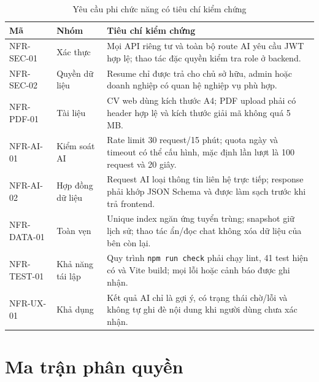 \begin{table}[H]
    \centering
    \small
    \begin{tabularx}{\textwidth}{|p{}|p{}|Y|} \hline
        \textbf{Mã} & \textbf{Nhóm} & \textbf{Tiêu chí kiểm chứng} \\ \hline
        NFR-SEC-01 & Xác thực & Mọi API riêng tư và toàn bộ route AI yêu cầu JWT hợp lệ; thao tác đặc quyền kiểm tra role ở backend. \\ \hline
        NFR-SEC-02 & Quyền dữ liệu & Resume chỉ được trả cho chủ sở hữu, admin hoặc doanh nghiệp có quan hệ nghiệp vụ phù hợp. \\ \hline
        NFR-PDF-01 & Tài liệu & CV web dùng kích thước A4; PDF upload phải có header hợp lệ và kích thước giải mã không quá 5 MB. \\ \hline
        NFR-AI-01 & Kiểm soát AI & Rate limit 30 request/15 phút; quota ngày và timeout có thể cấu hình, mặc định lần lượt là 100 request và 20 giây. \\ \hline
        NFR-AI-02 & Hợp đồng dữ liệu & Request AI loại thông tin liên hệ trực tiếp; response phải khớp JSON Schema và được làm sạch trước khi trả frontend. \\ \hline
        NFR-DATA-01 & Toàn vẹn & Unique index ngăn ứng tuyển trùng; snapshot giữ lịch sử; thao tác ẩn/đọc chat không xóa dữ liệu của bên còn lại. \\ \hline
        NFR-TEST-01 & Khả năng tái lập & Quy trình \texttt{npm run check} phải chạy lint, 41 test hiện có và Vite build; mọi lỗi hoặc cảnh báo được ghi nhận. \\ \hline
        NFR-UX-01 & Khả dụng & Kết quả AI chỉ là gợi ý, có trạng thái chờ/lỗi và không tự ghi đè nội dung khi người dùng chưa xác nhận. \\ \hline
    \end{tabularx}
    \caption{Yêu cầu phi chức năng có tiêu chí kiểm chứng}
    \label{tab:nonfunctional-requirements}
\end{table}

\section{Ma trận phân quyền}

